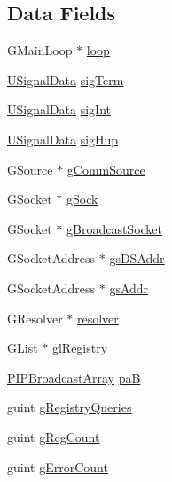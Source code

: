 \subsection*{Data Fields}
\begin{DoxyCompactItemize}
\item 
G\+Main\+Loop $\ast$ \hyperlink{struct__control_data_ae1b70bafbd5eb568c6ca339664959216}{loop}
\item 
\hyperlink{cmd_d_c_8c_a4d86cbb761613143e4ee60218efdfbaa}{U\+Signal\+Data} \hyperlink{struct__control_data_af45dc1f0c4806eaac0a57da17db50fdb}{sig\+Term}
\item 
\hyperlink{cmd_d_c_8c_a4d86cbb761613143e4ee60218efdfbaa}{U\+Signal\+Data} \hyperlink{struct__control_data_ae8ad5b5af46f4ab4bcd6ffb41e83385b}{sig\+Int}
\item 
\hyperlink{cmd_d_c_8c_a4d86cbb761613143e4ee60218efdfbaa}{U\+Signal\+Data} \hyperlink{struct__control_data_a551d0ecd4ceb9fc4ce8eebe5a984dc4c}{sig\+Hup}
\item 
G\+Source $\ast$ \hyperlink{struct__control_data_abfbd9e642ba240fa5985f63d60886de4}{g\+Comm\+Source}
\item 
G\+Socket $\ast$ \hyperlink{struct__control_data_a49b267275036fc3ac9b7d9e53b0625e1}{g\+Sock}
\item 
G\+Socket $\ast$ \hyperlink{struct__control_data_a05fab30fce92ebe541d9dd98220c60ef}{g\+Broadcast\+Socket}
\item 
G\+Socket\+Address $\ast$ \hyperlink{struct__control_data_a11c618822b208569a5d28206407326d5}{gs\+D\+S\+Addr}
\item 
G\+Socket\+Address $\ast$ \hyperlink{struct__control_data_a8a43853386551af4c746fd4b882eb2bf}{gs\+Addr}
\item 
G\+Resolver $\ast$ \hyperlink{struct__control_data_afe33a7083e1ecc9ba50a69644ed4a753}{resolver}
\item 
G\+List $\ast$ \hyperlink{struct__control_data_a34b1729bc0b37c9dce0327ea4cd8a812}{gl\+Registry}
\item 
\hyperlink{cmd_d_c_8c_a916d712cacebc2faeda930352280c361}{P\+I\+P\+Broadcast\+Array} \hyperlink{struct__control_data_a93f6e099a56c0d476607b4bd5a9dfa58}{paB}
\item 
guint \hyperlink{struct__control_data_ab4837eb7cc16bf85fe0bd839a428eaa5}{g\+Registry\+Queries}
\item 
guint \hyperlink{struct__control_data_a81bfc0d50c23ebe6708e065659d11eb8}{g\+Reg\+Count}
\item 
guint \hyperlink{struct__control_data_a0dcc9f369186f6cf7c99b2178be66e58}{g\+Error\+Count}

\end{DoxyCompactItemize}
